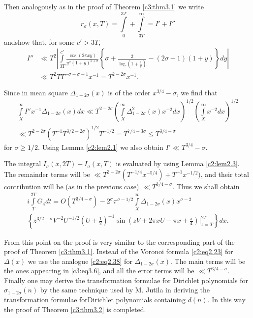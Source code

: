 Then analogously as in the proof of Theorem \ref{c3:thm3.1} we write
$$
r_\sigma (x, T)= \int\limits_0^{3T} + \int\limits_{3T}^\infty = I' + I''
$$
and\pageoriginale show that, for some $c'>3T$,
\begin{align*}
  I'' & \ll T^2 \left| \int\limits_{3T}^{c'} \frac{\cos (2 \pi
    xy)}{y^\sigma (1+ y)^{1+ \sigma}} \left\{\sigma + \frac{2}{\log
      \left(1+ \frac{1}{y}\right)} - (2 \sigma -1)(1+y)
    \right\}dy\right|\\[5pt]
    & \ll T^2 TT^{-\sigma- \sigma -1}x^{-1} = T^{2- 2 \sigma} x^{-1}. 
\end{align*}

Since in mean square $\Delta_{1- 2\sigma}(x)$ is of the order
$x^{3/4}-\sigma$, we find that
\begin{multline*}
  \int\limits_X^\infty I'' x^{-1} \Delta_{1- 2\sigma} (x) dx \ll T^{2-
    2 \sigma} \left(\int\limits_X^\infty \Delta_{1- 2 \sigma}^2 (x)
  x^{-2} dx \right)^{1/2} \left(\int\limits_X^\infty x^{-2} dx
  \right)^{1/2}\\[5pt]
  \ll T^{2-2\sigma} (T^{-1} T^{3/2- 2\sigma})^{1/2}T^{-1/2} = T^{7/4-
    3 \sigma} \leq T^{3/4- \sigma} 
\end{multline*}
for $\sigma \geq 1/2$. Using Lemma \ref{c2:lem2.1} we also obtain $I'
\ll T^{3/4}-\sigma$.

The integral $I_{\sigma}(x, 2T)- I_\sigma(x, T)$ is evaluated by
using Lemma \ref{c2:lem2.3}. The remainder terms will be $\ll
T^{2-2\sigma}(T^{-1/4}x^{-5/4})+ T^{-1}x^{-1/2})$, and their total
  contribution will be (as in the previous case) $\ll
  T^{3/4-\sigma}$. Thus we shall obtain
\begin{multline*}
  i \int\limits_T^{2T} G_4 dt = O(T^{3/4-\sigma})- 2^\sigma
  \pi^{\sigma- 1/2} \int\limits_X^\infty \Delta_{1-2\sigma} (x)
  x^{\sigma-2}\\
  \left\{z^{3/2-\sigma} V^{-2}U^{-1/2} \left(U + \frac{1}{2}
  \right)^{-1} \sin \left(zV + 2 \pi xU- \pi x+
  \frac{\pi}{4}\right)\Bigg|_{z=T}^{2T}  \right\}dx.
\end{multline*}

From this point on the proof is very similar to the corresponding part
of the proof of Theorem \ref{c3:thm3.1}. Instead of the Voronoi
formula \eqref{c2:eq2.23} for $\Delta(x)$ we use the analogue
\eqref{c2:eq2.38} for $\Delta_{1- 2\sigma}(x)$. The main terms will be
the ones appearing in \eqref{c3:eq3.6}, and all the error terms will
be $\ll T^{3/4-\sigma}$. Finally one may derive the transformation
formulae for Dirichlet polynomials for $\sigma_{1- 2 \sigma}(n)$ by
the same technique used by M. Jutila \cite{Jutila3} in deriving the
transformation formulae for\pageoriginale Dirichlet polynomials
containing $d(n)$. In this way the proof of Theorem \ref{c3:thm3.2} is
completed.

